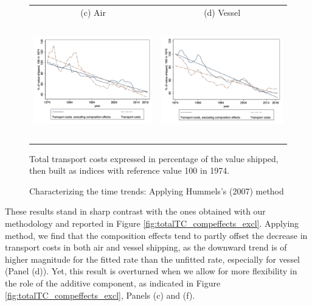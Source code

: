 \documentclass[a4paper,11pt]{article}
\begin{document}
\begin{figure}[htbp]
\caption{Characterizing the time trends: Applying Hummels's (2007) method }
\label{fig:comp_effects_as_in_Hummels}
\begin{center}
\begin{tabular}{cc}
{\small (c) Air } & {\small (d) Vessel}\\
\includegraphics[width=2.5in, height=2in]{figure5_comme_hummels_base100.jpg}
& \includegraphics[width=2.5in,height=2in]{figure6_comme_hummels_base100.jpg} \\
\end{tabular}
	\begin{minipage}  [c]  {5in}
		\footnotesize
Total transport costs expressed in percentage of the value shipped, then built as indices with reference value 100 in 1974.
\end{minipage}
\end{center}
\end{figure}

These results stand in sharp contrast with the ones obtained with our methodology and reported in Figure \ref{fig:totalTC_compeffects_excl}.
Applying \cite{hummels2007} method, we find that the composition effects tend to partly offset the decrease in transport costs in both air and vessel shipping, as the downward trend is of higher magnitude for the fitted rate than the unfitted rate, especially for vessel (Panel (d)). Yet, this result is overturned when we allow for more flexibility in the role of the additive component, as indicated in Figure \ref{fig:totalTC_compeffects_excl}, Panels (c) and (f).\medskip
\end{document}
